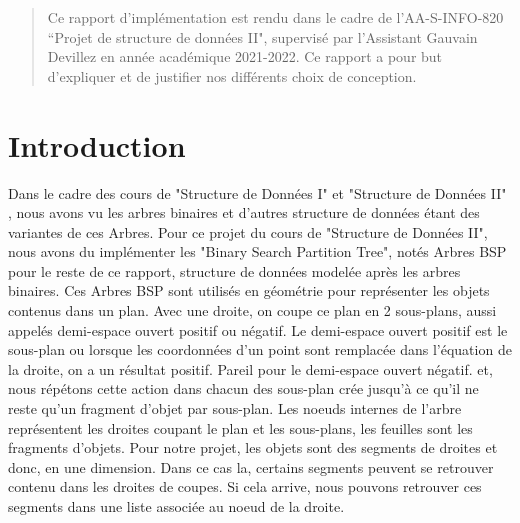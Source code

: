 \documentclass[a4paper,12pt]{report}	%
\begin{document}

	\umonsCoverPage		%
	
	
	\begin{abstract}	%
Ce rapport d'implémentation est rendu dans le cadre de l'AA-S-INFO-820 ``Projet de structure de données II", supervisé par l'Assistant Gauvain Devillez en année académique 2021-2022. Ce rapport a pour but d'expliquer et de justifier nos différents choix de conception.
	\end{abstract}
	
	\clearpage			%
	\tableofcontents
	


	\clearpage			%
	
	{\section*{Introduction}}
\noindent Dans le cadre des cours de "Structure de Données I" et "Structure de Données II" , nous avons vu les arbres binaires et
d'autres structure de données étant des variantes de ces Arbres. Pour ce projet du cours de "Structure de Données II",
nous avons du implémenter les "Binary Search Partition Tree", notés Arbres BSP pour le reste de ce rapport, structure de données
modelée après les arbres binaires. Ces Arbres BSP sont utilisés en géométrie pour représenter les objets contenus dans un plan.
Avec une droite, on coupe ce plan en 2 sous-plans, aussi appelés demi-espace ouvert positif ou négatif.
Le demi-espace ouvert positif est le sous-plan ou lorsque les coordonnées d'un point sont remplacée dans l'équation de la droite, on
a un résultat positif. Pareil pour le demi-espace ouvert négatif.
et, nous répétons cette action dans chacun des sous-plan crée jusqu'à ce qu'il ne reste qu'un fragment d'objet par sous-plan.
Les noeuds internes de l'arbre représentent les droites coupant le plan et les sous-plans, les feuilles sont les fragments d'objets.
Pour notre projet, les objets sont des segments de droites et donc, en une dimension. Dans ce cas la, certains segments
peuvent se retrouver contenu dans les droites de coupes. Si cela arrive, nous pouvons retrouver ces segments dans une liste
associée au noeud de la droite.
\end{document}
